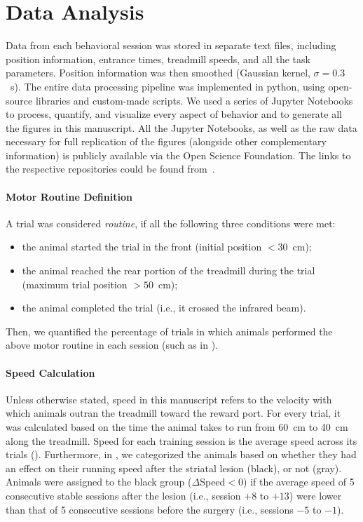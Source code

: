 \section{Data Analysis} 
\label{ch:methods:dataAnalysis}

Data from each behavioral session was stored in separate text files, including position information, entrance times, treadmill speeds, and all the task parameters.
Position information was then smoothed (Gaussian kernel, $\sigma = 0.3$~s).
The entire data processing pipeline was implemented in python, using open-source libraries and custom-made scripts.
We used a series of Jupyter Notebooks to process, quantify, and visualize every aspect of behavior and to generate all the figures in this manuscript.
All the Jupyter Notebooks, as well as the raw data necessary for full replication of the figures (alongside other complementary information) is publicly available via the Open Science Foundation.
The links to the respective repositories could be found from~\cite{Safaie2020PNAS,JuradoParras2020}.

\paragraph{Motor Routine Definition}
A trial was considered \emph{routine}, if all the following three conditions were met:
\begin{itemize}[noitemsep]
    \item the animal started the trial in the front (initial position $< 30$~cm);
    \item the animal reached the rear portion of the treadmill during the trial (maximum trial position $>50$~cm);
    \item the animal completed the trial (i.e., it crossed the infrared beam).
\end{itemize}
Then, we quantified the percentage of trials in which animals performed the above motor routine in each session (such as in ).

\paragraph{Speed Calculation}
Unless otherwise stated, speed in this manuscript refers to the velocity with which animals outran the treadmill toward the reward port.
For every trial, it was calculated based on the time the animal takes to run from 60~cm to 40~cm along the treadmill.
Speed for each training session is the average speed across its trials ().
Furthermore, in , we categorized the animals based on whether they had an effect on their running speed after the striatal lesion (black), or not (gray).
Animals were assigned to the black group ($\Delta$Speed$<0$) if the average speed of 5 consecutive stable sessions after the lesion (i.e., session $+8$ to $+13$) were lower than that of 5 consecutive sessions before the surgery (i.e., sessions $-5$ to $-1$).


